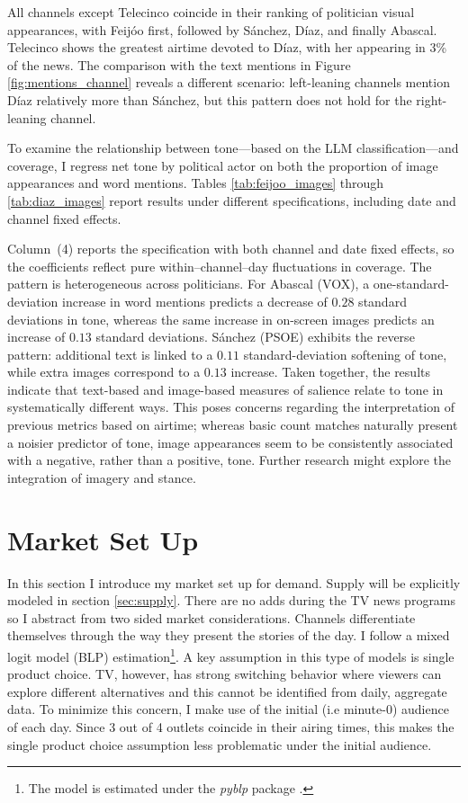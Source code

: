 \documentclass[12pt]{article}
\begin{document}
All channels except Telecinco coincide in their ranking of politician visual appearances, with Feijóo first, followed by Sánchez, Díaz, and finally Abascal. Telecinco shows the greatest airtime devoted to Díaz, with her appearing in 3\% of the news. The comparison with the text mentions in Figure \ref{fig:mentions_channel} reveals a different scenario: left-leaning channels mention Díaz relatively more than Sánchez, but this pattern does not hold for the right-leaning channel.

To examine the relationship between tone—based on the LLM classification—and coverage, I regress net tone by political actor on both the proportion of image appearances and word mentions. Tables \ref{tab:feijoo_images} through \ref{tab:diaz_images} report results under different specifications, including date and channel fixed effects.

Column~(4) reports the specification with both channel and date fixed effects, so the coefficients reflect pure within–channel–day fluctuations in coverage. The pattern is heterogeneous across politicians. For Abascal (VOX), a one-standard-deviation increase in word mentions predicts a decrease of $0.28$ standard deviations in tone, whereas the same increase in on-screen images predicts an increase of $0.13$ standard deviations. Sánchez (PSOE) exhibits the reverse pattern: additional text is linked to a $0.11$ standard-deviation softening of tone, while extra images correspond to a $0.13$ increase. Taken together, the results indicate that text-based and image-based measures of salience relate to tone in systematically different ways. This poses concerns regarding the interpretation of previous metrics based on airtime; whereas basic count matches naturally present a noisier predictor of tone, image appearances seem to be consistently associated with a negative, rather than a positive, tone. Further research might explore the integration of imagery and stance.



	
	
	
	\section{Market Set Up}\label{section:market}
	
In this section I introduce my market set up for demand. Supply will be explicitly modeled in section \ref{sec:supply}. There are no adds during the TV news programs so I abstract from two sided market considerations. Channels differentiate themselves through the way they present the stories of the day. I follow a mixed logit model \citep{berry_blp} (BLP) estimation\footnote{The model is estimated under the \textit{pyblp} package \citep{conlon2020best}.}. A key assumption in this type of models is single product choice. TV, however, has strong switching behavior where viewers can explore different alternatives and this cannot be identified from daily, aggregate data. To minimize this concern, I make use of the initial (i.e minute-0) audience of each day. Since 3 out of 4 outlets coincide in their airing times, this makes the single product choice assumption less problematic under the initial audience. 
\end{document}

